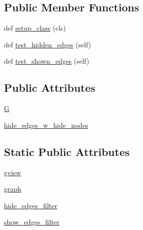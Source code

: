 \subsection*{Public Member Functions}
\begin{DoxyCompactItemize}
\item 
def \hyperlink{classnetworkx_1_1classes_1_1tests_1_1test__subgraphviews_1_1TestMultiGraphView_a034d6db6d5bc54aa527a9f3d7f425737}{setup\+\_\+class} (cls)
\item 
def \hyperlink{classnetworkx_1_1classes_1_1tests_1_1test__subgraphviews_1_1TestMultiGraphView_aefc4489eb41011afca14a7d56bfaaa16}{test\+\_\+hidden\+\_\+edges} (self)
\item 
def \hyperlink{classnetworkx_1_1classes_1_1tests_1_1test__subgraphviews_1_1TestMultiGraphView_ade332e3858ba7f1fe09aab1246b769d3}{test\+\_\+shown\+\_\+edges} (self)
\end{DoxyCompactItemize}
\subsection*{Public Attributes}
\begin{DoxyCompactItemize}
\item 
\hyperlink{classnetworkx_1_1classes_1_1tests_1_1test__subgraphviews_1_1TestMultiGraphView_ab9fcfaaaff1541577d4791fe46ce6e4e}{G}
\item 
\hyperlink{classnetworkx_1_1classes_1_1tests_1_1test__subgraphviews_1_1TestMultiGraphView_a3dc4dca7258315711da3ee045ca039e7}{hide\+\_\+edges\+\_\+w\+\_\+hide\+\_\+nodes}
\end{DoxyCompactItemize}
\subsection*{Static Public Attributes}
\begin{DoxyCompactItemize}
\item 
\hyperlink{classnetworkx_1_1classes_1_1tests_1_1test__subgraphviews_1_1TestMultiGraphView_adad165363f0d2d02fdabec62b06f4726}{gview}
\item 
\hyperlink{classnetworkx_1_1classes_1_1tests_1_1test__subgraphviews_1_1TestMultiGraphView_aa98bde243c91c1c91f52db2e332ee3e6}{graph}
\item 
\hyperlink{classnetworkx_1_1classes_1_1tests_1_1test__subgraphviews_1_1TestMultiGraphView_a6ce280df1982e3b6239b1562da85ad8d}{hide\+\_\+edges\+\_\+filter}
\item 
\hyperlink{classnetworkx_1_1classes_1_1tests_1_1test__subgraphviews_1_1TestMultiGraphView_a10f13cbe4a2e27652b7e0580aa0a91bb}{show\+\_\+edges\+\_\+filter}
\end{DoxyCompactItemize}


